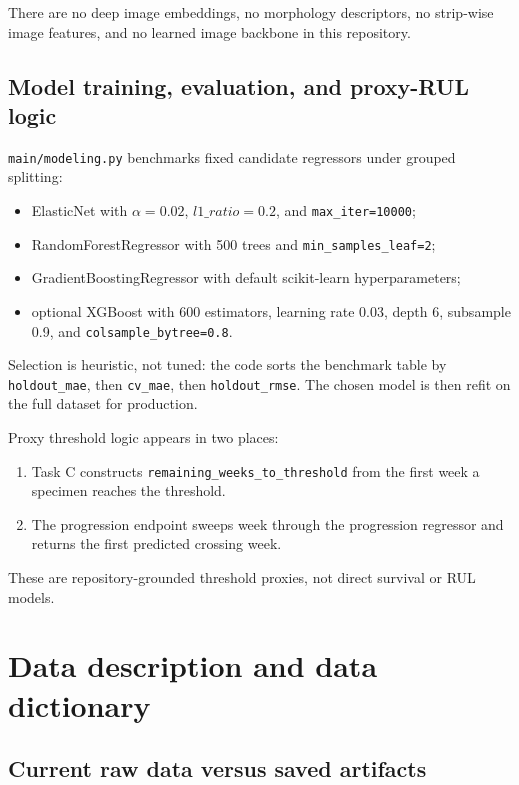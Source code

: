\documentclass[11pt]{article}
\begin{document}
There are no deep image embeddings, no morphology descriptors, no strip-wise image features, and no learned image backbone in this repository.

\subsection{Model training, evaluation, and proxy-RUL logic}
\texttt{main/modeling.py} benchmarks fixed candidate regressors under grouped splitting:
\begin{itemize}
  \item ElasticNet with \(\alpha=0.02\), \(l1\_ratio=0.2\), and \texttt{max\_iter=10000};
  \item RandomForestRegressor with 500 trees and \texttt{min\_samples\_leaf=2};
  \item GradientBoostingRegressor with default scikit-learn hyperparameters;
  \item optional XGBoost with 600 estimators, learning rate 0.03, depth 6, subsample 0.9, and \texttt{colsample\_bytree=0.8}.
\end{itemize}

Selection is heuristic, not tuned: the code sorts the benchmark table by \texttt{holdout\_mae}, then \texttt{cv\_mae}, then \texttt{holdout\_rmse}. The chosen model is then refit on the full dataset for production.

Proxy threshold logic appears in two places:
\begin{enumerate}
  \item Task C constructs \texttt{remaining\_weeks\_to\_threshold} from the first week a specimen reaches the threshold.
  \item The progression endpoint sweeps week through the progression regressor and returns the first predicted crossing week.
\end{enumerate}

These are repository-grounded threshold proxies, not direct survival or RUL models.

\section{Data description and data dictionary}

\subsection{Current raw data versus saved artifacts}
\end{document}
